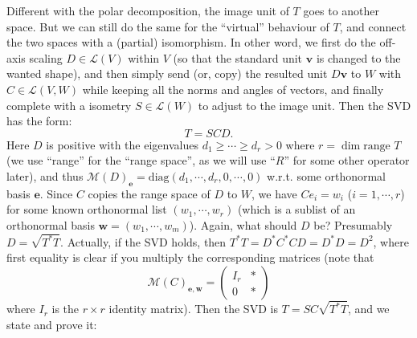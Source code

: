 \documentclass{article}
\begin{document}
Different with the polar decomposition, the image unit of $T$ goes to another space. But we can still do the same for the ``virtual'' behaviour of $T$, and connect the two spaces with a (partial) isomorphism. In other word, we first do the off-axis scaling $D\in\mathcal{L}(V)$ within $V$ (so that the standard unit $\pmb{v}$ is changed to the wanted shape), and then simply send (or, copy) the resulted unit $D\pmb{v}$ to $W$ with $C\in\mathcal{L}(V,W)$ while keeping all the norms and angles of vectors, and finally complete with a isometry $S\in\mathcal{L}(W)$ to adjust to the image unit. Then the SVD has the form:
$$ T = SCD. $$
Here $D$ is positive with the eigenvalues $d_1\geq\cdots\geq d_r>0$ where $r = \dim\text{range } T$ (we use ``range'' for the ``range space'', as we will use ``$R$'' for some other operator later), and thus $\mathcal{M}(D)_{\pmb{e}} = \text{diag}(d_1,\cdots,d_r,0,\cdots,0)$ w.r.t. some orthonormal basis $\pmb{e}$. Since $C$ copies the range space of $D$ to $W$, we have $Ce_i = w_i$ ($i=1,\cdots,r$) for some known orthonormal list $(w_1,\cdots,w_r)$ (which is a sublist of an orthonormal basis $\pmb{w} = (w_1,\cdots,w_m)$). Again, what should $D$ be? Presumably $D = \sqrt{T^\ast T}$. Actually, if the SVD holds, then $T^\ast T = D^\ast C^\ast C D = D^\ast D = D^2$, where first equality is clear if you multiply the corresponding matrices (note that
$$\mathcal{M}(C)_{\pmb{e}, \pmb{w}} = 
\begin{pmatrix}
    I_r & * \\
    0 & *
\end{pmatrix}$$
where $I_r$ is the $r\times r$ identity matrix). Then the SVD is $ T = SC\sqrt{T^\ast T} $, and we state and prove it:
\end{document}
